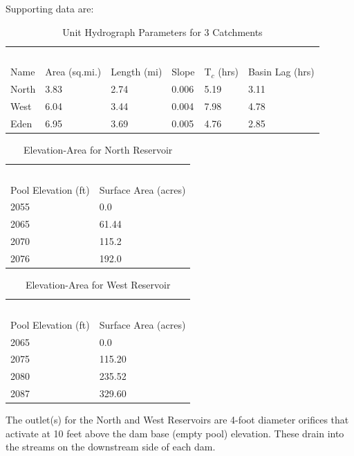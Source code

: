 \documentclass[12pt]{article}
\begin{document}
\begin{enumerate}
\clearpage

Supporting data are:

\begin{table}[h!]
\centering
\caption{Unit Hydrograph Parameters for 3 Catchments}
\begin{tabular}{p{1.0in}p{1.0in}p{1.0in}p{0.7in}p{0.7in}p{1.6in}} %
~&~\\
Name & Area (sq.mi.) & Length (mi) & Slope & T$_c$ (hrs) & Basin Lag (hrs)\\
\hline
\hline
North & 3.83& 2.74& 0.006& 5.19& 3.11\\
West & 6.04& 3.44& 0.004& 7.98& 4.78\\
Eden & 6.95& 3.69& 0.005& 4.76& 2.85\\
\hline
\end{tabular}
\label{tab:UH_hardin}
\end{table}

\begin{table}[h!]
\centering
\caption{Elevation-Area for North Reservoir}
\begin{tabular}{p{2.0in}p{2.0in}} %
~&~\\
Pool Elevation (ft) & Surface Area (acres) \\
\hline
\hline
2055 & 0.0\\
2065 & 61.44\\
2070 & 115.2\\
2076 & 192.0\\
\hline
\end{tabular}
\label{tab:EA_North}
\end{table}

\begin{table}[h!]
\centering
\caption{Elevation-Area for West Reservoir}
\begin{tabular}{p{2.0in}p{2.0in}} %
~&~\\
Pool Elevation (ft) & Surface Area (acres) \\
\hline
\hline
2065 & 0.0\\
2075 & 115.20\\
2080 & 235.52\\
2087 & 329.60\\
\hline
\end{tabular}
\label{tab:EA_West}
\end{table}

The outlet(s) for the North and West Reservoirs are 4-foot diameter orifices that activate at 10 feet above the dam base (empty pool) elevation.  These drain into the streams on the downstream side of each dam.


\end{enumerate}
\end{document}
